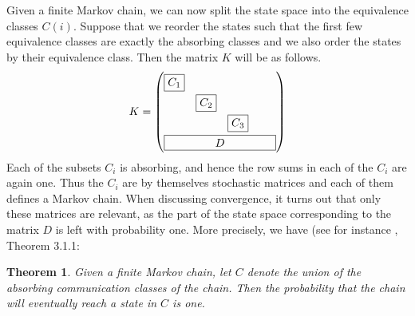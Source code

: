 \documentclass[a4paper, draft]{article}
\theoremstyle{own}
\newtheorem{thm}{Theorem}[section]
\theoremstyle{remark}
\begin{document}
Given a finite Markov chain, we can now split the state space into the equivalence classes $C(i)$. Suppose that we reorder the states such that the first few equivalence classes are exactly the absorbing classes and we also order the states by their equivalence class. Then the matrix $K$ will be as follows.
$$
K =
\begingroup %
\renewcommand\arraystretch{1.5}
\begin{pmatrix}
\boxed{C_1} & &  & \\
& \boxed{C_2} & & \\
& & \boxed{C_3} & \\
\multicolumn{4}{c}{\framebox[100pt]{$D$}}
\end{pmatrix}
\endgroup
$$
Each of the subsets $C_i$ is absorbing, and hence the row sums in each of the $C_i$ are again one. Thus the $C_i$ are by themselves stochastic matrices and each of them defines a Markov chain. When discussing convergence, it turns out that only these matrices are relevant, as the part of the state space corresponding to the matrix $D$ is left with probability one. More precisely, we have (see for instance \cite{KemenySnell}, Theorem 3.1.1:

\begin{thm}
	Given a finite Markov chain, let $C$ denote the union of the absorbing communication classes of the chain. Then the probability that the chain will eventually reach a state in $C$ is one.
\end{thm}
\end{document}
